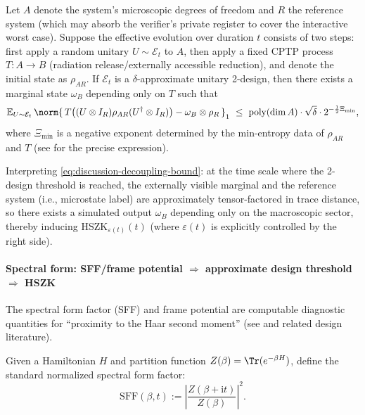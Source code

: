 \begin{theorem}\label{thm:discussion-2design-decoupling-hszk}
Let \(A\) denote the system's microscopic degrees of freedom and \(R\) the reference system (which may absorb the verifier's private register to cover the interactive worst case).
Suppose the effective evolution over duration \(t\) consists of two steps: first apply a random unitary \(U\sim\mathcal{E}_t\) to \(A\), then apply a fixed CPTP process \(T:A\to B\) (radiation release/externally accessible reduction), and denote the initial state as \(\rho_{AR}\).
If \(\mathcal{E}_t\) is a \(\delta\)-approximate unitary 2-design, then there exists a marginal state \(\omega_B\) depending only on \(T\) such that
\begin{equation}\label{eq:discussion-decoupling-bound}
\mathbb{E}_{U\sim\mathcal{E}_t}\,
\norm{\,T\bigl((U\otimes I_R)\rho_{AR}(U^\dagger\otimes I_R)\bigr)-\omega_B\otimes\rho_R\,}_1
\ \le\
\mathrm{poly}(\dim A)\cdot \sqrt{\delta}\cdot 2^{-\frac12\Xi_{\min}},
\end{equation}
where \(\Xi_{\min}\) is a negative exponent determined by the min-entropy data of \(\rho_{AR}\) and \(T\) (see \cite{SzehrDupuisTomamichelRenner2013DecouplingTwoDesigns} for the precise expression).
\par
Interpreting \eqref{eq:discussion-decoupling-bound}: at the time scale where the 2-design threshold is reached, the externally visible marginal and the reference system (i.e., microstate label) are approximately tensor-factored in trace distance, so there exists a simulated output \(\omega_B\) depending only on the macroscopic sector, thereby inducing \(\mathrm{HSZK}_{\varepsilon(t)}(t)\) (where \(\varepsilon(t)\) is explicitly controlled by the right side).
\end{theorem}

\paragraph{Spectral form: SFF/frame potential \texorpdfstring{$\Rightarrow$}{=>} approximate design threshold \texorpdfstring{$\Rightarrow$}{=>} HSZK}
The spectral form factor (SFF) and frame potential are computable diagnostic quantities for ``proximity to the Haar second moment'' (see \cite{Liu2018SpectralFormFactors} and related design literature).

\begin{definition}\label{def:discussion-sff}
Given a Hamiltonian \(H\) and partition function \(Z(\beta)=\Tr(e^{-\beta H})\), define the standard normalized spectral form factor:
\[
\mathrm{SFF}(\beta,t):=\left|\frac{Z(\beta+\mathrm{i}t)}{Z(\beta)}\right|^2.
\]
\end{definition}

